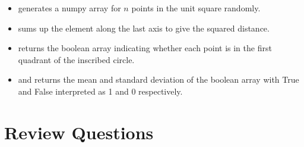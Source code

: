 \documentclass[letterpaper,10pt,english]{sphinxmanual}
\begin{document}
\begin{sphinxVerbatim}[commandchars=\\\{\}]
 
        
        
          
     \PYG{p}{[}     \PYG{p}{]}
\end{sphinxVerbatim}
\begin{itemize}
\item {} 
 generates a numpy array for \(n\) points in the unit square randomly.

\item {} 
 sums up the element along the last axis to give the squared distance.

\item {} 
\sphinxcode{\sphinxupquote{<}} returns the boolean array indicating whether each point is in the first quadrant of the inscribed circle.

\item {} 
 and  returns the mean and standard deviation of the boolean array with True and False interpreted as 1 and 0 respectively.

\end{itemize}


\chapter{Review Questions}
\label{\detokenize{Review/Review Questions:review-questions}}\label{\detokenize{Review/Review Questions::doc}}
\end{document}
